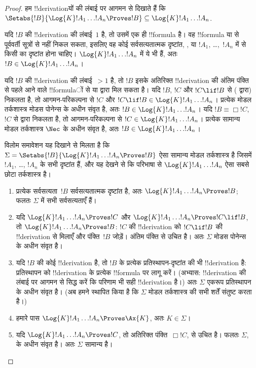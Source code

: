 \documentclass[../../../include/open-logic-section]{subfiles}
\begin{document}
\begin{proof}
  हम !!{derivation}यों की लंबाई पर आगमन से दिखाते हैं कि
  $\Setabs{!B}{\Log{K} !A_1 \dots !A_n \Proves !B} \subseteq
  \Log{K} !A_1 \dots !A_n$.

  यदि $!B$ की !!{derivation} की लंबाई~$1$ है, तो उसमें एक ही !!{formula} है।
  वह !!{formula} \MP{} या \Nec{} से पूर्ववर्ती सूत्रों से नहीं निकल सकता,
  इसलिए वह कोई सर्वसत्यतात्मक दृष्टांत, ,
   या $!A_1$, \dots,~$!A_n$ में से किसी का
  दृष्टांत होना चाहिए। $\Log{K}!A_1\dots!A_n$ में ये भी हैं, अतः
  $!B \in \Log{K}!A_1 \dots !A_n$।

  यदि $!B$ की !!{derivation} की लंबाई~$>1$ है, तो $!B$ इसके अतिरिक्त
  !!{derivation} की अंतिम पंक्ति से पहले आने वाले !!{formula}ों से \MP{} या
  \Nec{} द्वारा मिल सकता है। यदि $!B$, $!C$ और $!C \lif !B$ से (\MP{} द्वारा)
  निकलता है, तो आगमन-परिकल्पना से $!C$ और
  $!C \lif !B \in \Log{K}!A_1 \dots !A_n$। प्रत्येक मोडल तर्कशास्त्र मोडस
  पोनेन्स के अधीन संवृत है, अतः $!B \in \Log{K}!A_1 \dots !A_n$। यदि
  $!B \equiv \Box !C$, $!C$ से \Nec{} द्वारा निकलता है, तो आगमन-परिकल्पना
  से $!C \in \Log{K}!A_1 \dots !A_n$। प्रत्येक सामान्य मोडल तर्कशास्त्र
  $\Nec$ के अधीन संवृत है, अतः $!B \in \Log{K}!A_1\dots!A_n$।

  विलोम समावेशन यह दिखाने से मिलता है कि
  $\Sigma = \Setabs{!B}{\Log{K} !A_1 \dots !A_n \Proves !B }$
  ऐसा सामान्य मोडल तर्कशास्त्र है जिसमें $!A_1$, \dots, $!A_n$ के सभी
  दृष्टांत हैं, और यह देखने से कि परिभाषा से $\Log{K} !A_1 \dots !A_n$
  ऐसा सबसे छोटा तर्कशास्त्र है।
  \begin{enumerate}
    \item प्रत्येक सर्वसत्यता~$!B$ सर्वसत्यतात्मक दृष्टांत है, अतः
      $\Log{K}!A_1\dots!A_n \Proves !B$; फलतः
      $\Sigma$ में सभी सर्वसत्यताएँ हैं।
    \item यदि $\Log{K}!A_1\dots!A_n \Proves !C$ और
      $\Log{K}!A_1\dots!A_n \Proves !C \lif !B$, तो
      $\Log{K}!A_1\dots!A_n \Proves !B$: $!C$ की !!{derivation} को
      $!C \lif !B$ की !!{derivation} से मिलाएँ और पंक्ति~$!B$ जोड़ें। अंतिम
      पंक्ति \MP{} से उचित है। अतः $\Sigma$ मोडस पोनेन्स के अधीन संवृत है।
    \item यदि $!B$ की कोई !!{derivation} है, तो $!B$ के प्रत्येक
      प्रतिस्थापन-दृष्टांत की भी !!{derivation} है: प्रतिस्थापन को
      !!{derivation} के प्रत्येक !!{formula} पर लागू करें। (अभ्यास:
      !!{derivation} की लंबाई पर आगमन से सिद्ध करें कि परिणाम भी सही
      !!{derivation} है।) अतः $\Sigma$ एकरूप प्रतिस्थापन के अधीन संवृत है।
      (अब हमने स्थापित किया है कि $\Sigma$ मोडल तर्कशास्त्र की सभी शर्तें
      संतुष्ट करता है।)
    \item हमारे पास $\Log{K}!A_1\dots!A_n \Proves \Ax{K}$, अतः
      $K \in \Sigma$।
    \item यदि $\Log{K}!A_1\dots!A_n \Proves !C$, तो अतिरिक्त
      पंक्ति~$\Box !C$, \Nec{} से उचित है। फलतः $\Sigma$, \Nec{} के अधीन
      संवृत है। अतः $\Sigma$ सामान्य है।
  \end{enumerate}
\end{proof}
\end{document}
